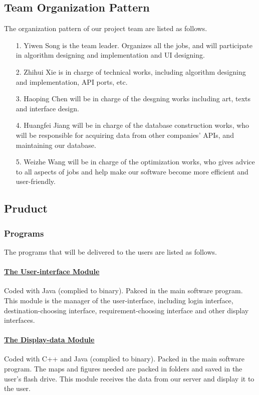 \documentclass[10pt]{article}
\begin{document}
\subsection{Team Organization Pattern}
The organization pattern of our project team are listed as follows.

\begin{itemize}
	\item[1.] Yiwen Song is the team leader. Organizes all the jobs, and will participate in algorithm designing and implementation and UI designing.
	\item[2.] Zhihui Xie is in charge of technical works, including algorithm designing and implementation, API ports, etc.
	\item[3.] Haoping Chen will be in charge of the desgning works including art, texts and interface design.
	\item[4.] Huangfei Jiang will be in charge of the database construction works, who will be responsible for acquiring data from other companies' APIs, and maintaining our database.
	\item[5.] Weizhe Wang will be in charge of the optimization works, who gives advice to all aspects of jobs and help make our software become more efficient and user-friendly.  
\end{itemize}

\subsection{Pruduct}
\subsubsection{Programs}
The programs that will be delivered to the users are listed as follows.

\paragraph{\underline{The User-interface Module}} Coded with Java (complied to binary). Pakced in the main software program. This module is the manager of the user-interface, including login interface, destination-choosing interface, requirement-choosing interface and other display interfaces.

\paragraph{\underline{The Display-data Module}} Coded with C++ and Java (complied to binary). Packed in the main software program. The maps and figures needed are packed in folders and saved in the user's flash drive. This module receives the data from our server and display it to the user.
\end{document}
